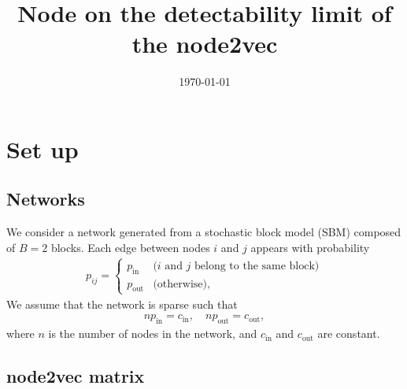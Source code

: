\documentclass[12pt]{article} %
\begin{document}

\title{Node on the detectability limit of the node2vec} %
\date{\today}
\maketitle %

\section{Set up}
\label{sec:introduction}

\subsection{Networks}

We consider a network generated from a stochastic block model (SBM) composed of $B=2$ blocks.
Each edge between nodes $i$ and $j$ appears with probability
\begin{align}
    p_{ij} = \left\{
        \begin{array}{cl}
            p_{\text{in}} & \text{($i$ and $j$ belong to the same block)} \\
            p_{\text{out}} & \text{(otherwise)},
        \end{array}
    \right.
\end{align}
We assume that the network is sparse such that
\begin{align}
    n p_{\text{in}} = c_{\text{in}},\quad n p_{\text{out}} = c_{\text{out}},
\end{align}
where $n$ is the number of nodes in the network, and $c_{\text{in}}$ and $c_{\text{out}}$ are constant.

\subsection{node2vec matrix}
\end{document}

